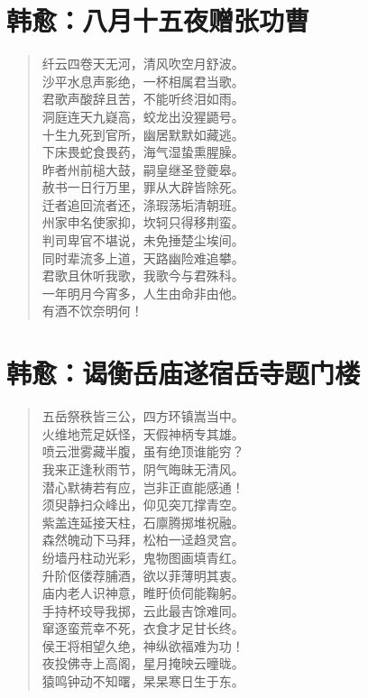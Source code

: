 \documentclass[12pt,oneside]{book}
\newenvironment{shici}{
\begin{verse}
\centering\large\hspace{12pt}}
{\end{verse}}
\begin{document}
\chapter{韩愈：八月十五夜赠张功曹}
\begin{shici}
纤云四卷天无河，清风吹空月舒波。\\
沙平水息声影绝，一杯相属君当歌。\\
君歌声酸辞且苦，不能听终泪如雨。\\
洞庭连天九嶷高，蛟龙出没猩鼯号。\\
十生九死到官所，幽居默默如藏逃。\\
下床畏蛇食畏药，海气湿蛰熏腥臊。\\
昨者州前槌大鼓，嗣皇继圣登夔皋。\\
赦书一日行万里，罪从大辟皆除死。\\
迁者追回流者还，涤瑕荡垢清朝班。\\
州家申名使家抑，坎轲只得移荆蛮。\\
判司卑官不堪说，未免捶楚尘埃间。\\
同时辈流多上道，天路幽险难追攀。\\
君歌且休听我歌，我歌今与君殊科。\\
一年明月今宵多，人生由命非由他。\\
有酒不饮奈明何！
\end{shici}

\chapter{韩愈：谒衡岳庙遂宿岳寺题门楼}
\begin{shici}
五岳祭秩皆三公，四方环镇嵩当中。\\
火维地荒足妖怪，天假神柄专其雄。\\
喷云泄雾藏半腹，虽有绝顶谁能穷？\\
我来正逢秋雨节，阴气晦昧无清风。\\
潜心默祷若有应，岂非正直能感通！\\
须臾静扫众峰出，仰见突兀撑青空。\\
紫盖连延接天柱，石廪腾掷堆祝融。\\
森然魄动下马拜，松柏一迳趋灵宫。\\
纷墙丹柱动光彩，鬼物图画填青红。\\
升阶伛偻荐脯酒，欲以菲薄明其衷。\\
庙内老人识神意，睢盱侦伺能鞠躬。\\
手持杯珓导我掷，云此最吉馀难同。\\
窜逐蛮荒幸不死，衣食才足甘长终。\\
侯王将相望久绝，神纵欲福难为功！\\
夜投佛寺上高阁，星月掩映云曈昽。\\
猿鸣钟动不知曙，杲杲寒日生于东。
\end{shici}
\end{document}
